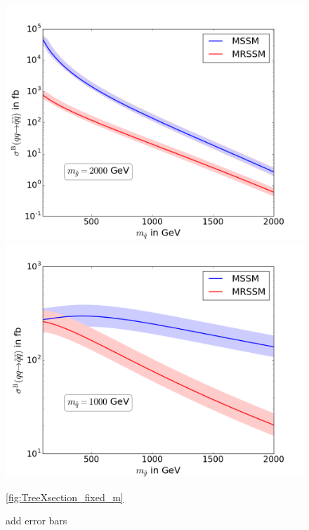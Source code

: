 \begin{figure}[!htpb]
\begin{center}
\includegraphics[scale=.5]{figures/MSSM+MRSSM_msg=2000}
\includegraphics[scale=.5]{figures/MSSM+MRSSM_msq=1000}
\caption{add error bars}\ref{fig:TreeXsection_fixed_m}
\end{center}
\end{figure}
